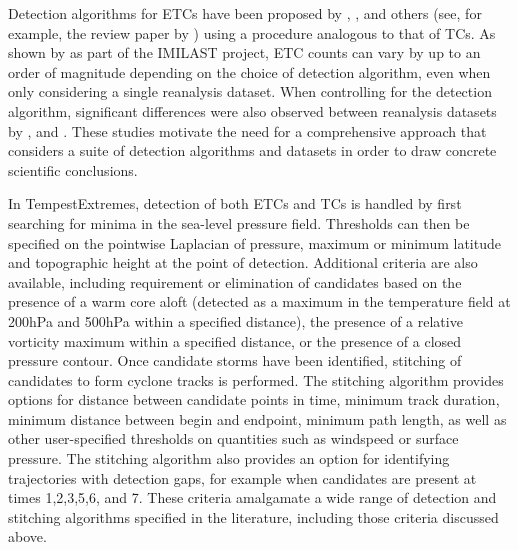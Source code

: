 \documentclass[11pt]{article}
\begin{document}
Detection algorithms for ETCs have been proposed by \cite{wang2006climatology}, \cite{wernli2006surface}, \cite{raible2008northern} and others (see, for example, the review paper by \cite{ulbrich2009extra}) using a procedure analogous to that of TCs.  As shown by \cite{neu2013imilast} as part of the IMILAST project, ETC counts can vary by up to an order of magnitude depending on the choice of detection algorithm, even when only considering a single reanalysis dataset.  When controlling for the detection algorithm, significant differences were also observed between reanalysis datasets by \cite{hodges2003comparison}, \cite{wang2006climatology} and \cite{raible2008northern}.  These studies motivate the need for a comprehensive approach that considers a suite of detection algorithms and datasets in order to draw concrete scientific conclusions.

In TempestExtremes, detection of both ETCs and TCs is handled by first searching for minima in the sea-level pressure field.  Thresholds can then be specified on the pointwise Laplacian of pressure, maximum or minimum latitude and topographic height at the point of detection.  Additional criteria are also available, including requirement or elimination of candidates based on the presence of a warm core aloft (detected as a maximum in the temperature field at 200hPa and 500hPa within a specified distance), the presence of a relative vorticity maximum within a specified distance, or the presence of a closed pressure contour.  Once candidate storms have been identified, stitching of candidates to form cyclone tracks is performed.  The stitching algorithm provides options for distance between candidate points in time, minimum track duration, minimum distance between begin and endpoint, minimum path length, as well as other user-specified thresholds on quantities such as windspeed or surface pressure.  The stitching algorithm also provides an option for identifying trajectories with detection gaps, for example when candidates are present at times 1,2,3,5,6, and 7.  These criteria amalgamate a wide range of detection and stitching algorithms specified in the literature, including those criteria discussed above.

\end{document}
